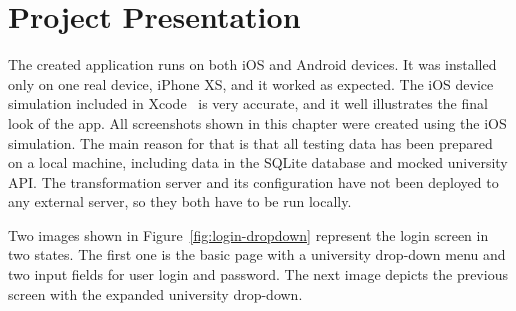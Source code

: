 \chapter{Project Presentation}
The created application runs on both iOS and Android devices. It was installed only on one real device, iPhone XS, and it worked as expected. The iOS device simulation included in Xcode~\cite{xcode} is very accurate, and it well illustrates the final look of the app. All screenshots shown in this chapter were created using the iOS simulation. The main reason for that is that all testing data has been prepared on a local machine, including data in the SQLite database and mocked university API. The transformation server and its configuration have not been deployed to any external server, so they both have to be run locally.

Two images shown in Figure~\ref{fig:login-dropdown} represent the login screen in two states. The first one is the basic page with a university drop-down menu and two input fields for user login and password. The next image depicts the previous screen with the expanded university drop-down.

